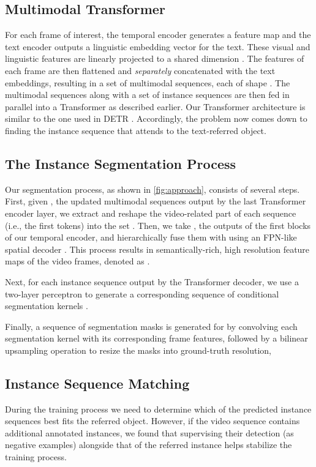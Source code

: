 \documentclass[10pt,twocolumn,letterpaper]{article}
\renewcommand{\cite}[1]{\citep{#1}}
\begin{document}
\subsection{Multimodal Transformer} \label{subsec:Transformer}
For each frame of interest, the temporal encoder generates a feature map  and the text encoder outputs a linguistic embedding vector  for the text. These visual and linguistic features are linearly projected to a shared dimension . The features of each frame are then flattened and \textit{separately} concatenated with the text embeddings, resulting in a set of  multimodal sequences, each of shape . 
The multimodal sequences along with a set of  instance sequences are then fed in parallel into a Transformer as described earlier. Our Transformer architecture is similar to the one used in DETR \cite{carion2020detr}. Accordingly, the problem now comes down to finding the instance sequence that attends to the text-referred object.

\subsection{The Instance Segmentation Process} \label{subsec:segmentation}
Our segmentation process, as shown in \cref{fig:approach}, consists of several steps.
First, given , the updated multimodal sequences output by the last Transformer encoder layer, we extract and reshape the video-related part of each sequence (i.e., the first  tokens)  into the set .
Then, we take , the outputs of the first  blocks of our temporal encoder, and hierarchically fuse them with  using an FPN-like \cite{lin2017fpn} spatial decoder . This process results in semantically-rich, high resolution feature maps of the video frames, denoted as .

Next, for each instance sequence  output by the Transformer decoder, we use a two-layer perceptron  to generate a corresponding sequence of conditional segmentation kernels \cite{tian2020conditional,wang2021maxdeeplab}.

Finally, a sequence of segmentation masks  is generated for  by convolving each segmentation kernel with its corresponding frame features, followed by a bilinear upsampling operation to resize the masks into ground-truth resolution,

\subsection{Instance Sequence Matching} \label{subsec:matching}
During the training process we need to determine which of the predicted instance sequences best fits the referred object. However, if the video sequence  contains additional annotated instances, we found that supervising their detection (as negative examples) alongside that of the referred instance helps stabilize the training process. 
\end{document}
